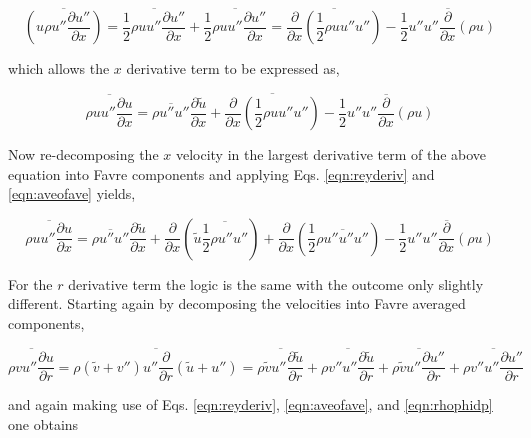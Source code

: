 \begin{displaymath}
	\overline{(u \rho u'' \frac{\partial u''}{\partial x})} = \overline{\frac{1}{2}\rho u u'' \frac{\partial u''}{\partial x}}
	+ \overline{\frac{1}{2}\rho u u'' \frac{\partial u''}{\partial x}} = \overline{\frac{\partial}{\partial x}
	(\frac{1}{2}\rho u u'' u'')} - \overline{\frac{1}{2}u''u''\frac{\partial}{\partial x}(\rho u)} 
\end{displaymath}

	which allows the $x$ derivative term to be expressed as,

\begin{displaymath}
	\overline{\rho u u'' \frac{\partial u}{\partial x}} = \overline{\rho u'' u''}\frac{\partial \tilde u}{\partial x}
	+  \overline{\frac{\partial}{\partial x}
	(\frac{1}{2}\rho u u'' u'')} - \overline{\frac{1}{2}u''u''\frac{\partial}{\partial x}(\rho u)} 
\end{displaymath}

	Now re-decomposing the $x$ velocity in the largest derivative term of the above equation into Favre components
and applying Eqs. \ref{eqn:reyderiv} and \ref{eqn:aveofave} yields,

\begin{equation}
	\overline{\rho u u'' \frac{\partial u}{\partial x}} = \overline{\rho u'' u''}\frac{\partial \tilde u}{\partial x}
	+ \frac{\partial}{\partial x}(\tilde u \overline{\frac{1}{2}\rho u'' u''}) + \frac{\partial}{\partial x}(\frac{1}{2}
	\overline{\rho u'' u'' u''})- \overline{\frac{1}{2}u''u''\frac{\partial}{\partial x}(\rho u)}
\label{eqn:xderivterm}
\end{equation}

	For the $r$ derivative term the logic is the same with the outcome only slightly different.  Starting again
by decomposing the velocities into Favre averaged components,

\begin{displaymath}
	\overline{\rho v u'' \frac{\partial u}{\partial r}} = \overline{\rho (\tilde v + v'')u''\frac{\partial}{\partial r}
	(\tilde u + u'')} = \overline{\rho \tilde v u'' \frac{\partial \tilde u}{\partial r}} + \overline{\rho v'' u''
	\frac{\partial \tilde u}{\partial r}} + \overline{\rho \tilde v u'' \frac{\partial u''}{\partial r}} +
	\overline{\rho v'' u'' \frac{\partial u''}{\partial r}} 
\end{displaymath}

	and again making use of Eqs. \ref{eqn:reyderiv}, \ref{eqn:aveofave}, and \ref{eqn:rhophidp} one obtains


